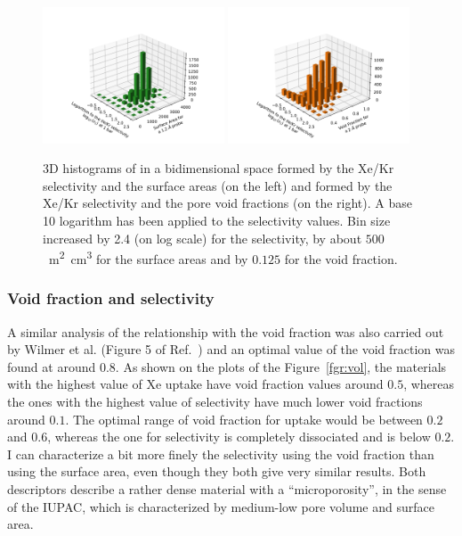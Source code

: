 \documentclass[main.tex]{subfiles}
\begin{document}
\begin{figure}[ht!]
  \centering
  \includegraphics[width=0.48\textwidth]{figures/2-thermo/3D_hist_selec_SA.pdf}
  \includegraphics[width=0.48\textwidth]{figures/2-thermo/3D_hist_selec_vol.pdf}
  \caption{3D histograms of in a bidimensional space formed by the Xe/Kr selectivity and the surface areas (on the left) and formed by the Xe/Kr selectivity and the pore void fractions (on the right). A base 10 logarithm has been applied to the selectivity values. Bin size increased by 2.4 (on log scale) for the selectivity, by about $500$~\si{\square\meter\cubic\centi\meter} for the surface areas and by $0.125$ for the void fraction. }\label{fgr:3D_hist_sa_vol}
\end{figure}

\subsubsection{Void fraction and selectivity}

A similar analysis of the relationship with the void fraction was also carried out by Wilmer et al. (Figure 5 of Ref.~\cite{Wilmer_2012}) and an optimal value of the void fraction was found at around $0.8$. As shown on the plots of the Figure~\ref{fgr:vol}, the materials with the highest value of Xe uptake have void fraction values around $0.5$, whereas the ones with the highest value of selectivity have much lower void fractions around $0.1$. The optimal range of void fraction for uptake would be between $0.2$ and $0.6$, whereas the one for selectivity is completely dissociated and is below $0.2$. I can characterize a bit more finely the selectivity using the void fraction than using the surface area, even though they both give very similar results. Both descriptors describe a rather dense material with a ``microporosity'', in the sense of the IUPAC\autocite{Sing_1985}, which is characterized by medium-low pore volume and surface area.
\end{document}
